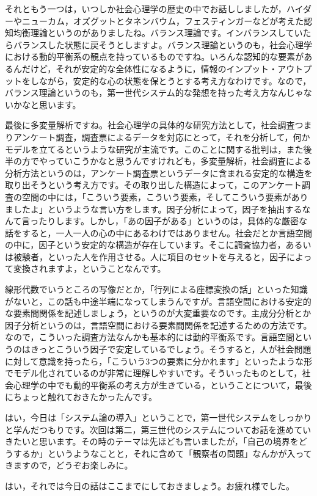 \documentclass{ltjsbook}
\begin{document}
それともう一つは，いつしか社会心理学の歴史の中でお話ししましたが，ハイダーやニューカム，オズグットとタネンバウム，フェスティンガーなどが考えた認知均衡理論というのがありましたね。バランス理論です。インバランスしていたらバランスした状態に戻そうとしますよ。バランス理論というのも，社会心理学における動的平衡系の観点を持っているものですね。いろんな認知的な要素があるんだけど，それが安定的な全体性になるように，情報のインプット・アウトプットをしながら，安定的な心の状態を保とうとする考え方なわけです。なので，バランス理論というのも，第一世代システム的な発想を持った考え方なんじゃないかなと思います。

最後に多変量解析ですね。社会心理学の具体的な研究方法として，社会調査つまりアンケート調査，調査票によるデータを対応にとって，それを分析して，何かモデルを立てるというような研究が主流です。このことに関する批判は，また後半の方でやっていこうかなと思うんですけれども，多変量解析，社会調査による分析方法というのは，アンケート調査票というデータに含まれる安定的な構造を取り出そうという考え方です。その取り出した構造によって，このアンケート調査の空間の中には，「こういう要素，こういう要素，そしてこういう要素がありましたよ」というような言い方をします。因子分析によって，因子を抽出するなんて言ったりします。しかし，「あの因子がある」というのは，具体的な厳密な話をすると，一人一人の心の中にあるわけではありません。社会だとか言語空間の中に，因子という安定的な構造が存在しています。そこに調査協力者，あるいは被験者，といった人を作用させる。人に項目のセットを与えると，因子によって変換されますよ，ということなんです。

線形代数でいうところの写像だとか，「行列による座標変換の話」といった知識がないと，この話も中途半端になってしまうんですが。言語空間における安定的な要素間関係を記述しましょう，というのが大変重要なのです。主成分分析とか因子分析というのは，言語空間における要素間関係を記述するための方法です。なので，こういった調査方法なんかも基本的には動的平衡系です。言語空間というのはきっとこういう因子で安定しているでしょう。そうすると，人が社会問題に対して意識を持ったら，「こういう3つの要素に分かれます」といったような形でモデル化されているのが非常に理解しやすいです。そういったものとして，社会心理学の中でも動的平衡系の考え方が生きている，ということについて，最後にちょっと触れておきたかったんです。



はい，今日は「システム論の導入」ということで，第一世代システムをしっかりと学んだつもりです。次回は第二，第三世代のシステムについてお話を進めていきたいと思います。その時のテーマは先ほども言いましたが，「自己の境界をどうするか」というようなことと，それに含めて「観察者の問題」なんかが入ってきますので，どうぞお楽しみに。

はい，それでは今日の話はここまでにしておきましょう。お疲れ様でした。
\end{document}
